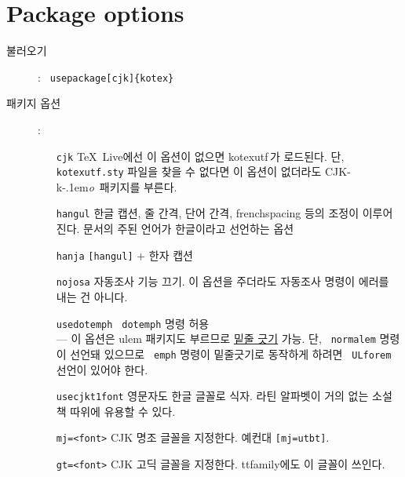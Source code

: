 \documentclass[dvipdfmx,b5paper]{article}
\def\cs#1{\texttt{\color{teal}\char92 #1}}
\def\cjkko{\mbox{CJK-\textsf{k}\kern-.1em\textit{o}}}
\begin{document}
\section{Package options}
  \begin{description}
    \item[불러오기]: \quad\cs{usepackage[cjk]\{kotex\}}
      \medskip
    \item[패키지 옵션]:
      \begin{itemize}
        \item[\texttt{cjk}] \TeX\ Live에선 이 옵션이 없으면 kotexutf\,가
          로드된다. 단, \verb|kotexutf.sty| 파일을 찾을 수 없다면
          이 옵션이 없더라도 \cjkko\ 패키지를 부른다.
        \item[\texttt{hangul}] 한글 캡션, 줄 간격, 단어 간격, frenchspacing
          등의 조정이 이루어진다. 문서의 주된 언어가 한글이라고 선언하는 옵션
        \item[\texttt{hanja}] \verb|[hangul]| $+$ 한자 캡션
        \item[\texttt{nojosa}] 자동조사 기능 끄기. 이 옵션을 주더라도
          자동조사 명령이 에러를 내는 건 아니다.
        \item[\texttt{usedotemph}] \cs{dotemph} 명령 허용\\
          --- 이 옵션은 ulem 패키지도 부르므로 \uline{밑줄 긋기} 가능.
          단, \cs{normalem} 명령이 선언돼 있으므로 \cs{emph} 명령이
          밑줄긋기로 동작하게 하려면 \cs{ULforem} 선언이 있어야 한다.
        \item[\texttt{usecjkt1font}] 영문자도 한글 글꼴로 식자.
           라틴 알파벳이 거의 없는 소설책 따위에 유용할 수 있다.
        \item[\texttt{mj=<font>}] CJK 명조 글꼴을 지정한다. 예컨대
          \verb|[mj=utbt]|.
        \item[\texttt{gt=<font>}] CJK 고딕 글꼴을 지정한다. ttfamily에도
          이 글꼴이 쓰인다.
      \end{itemize}
  \end{description}
\end{document}
